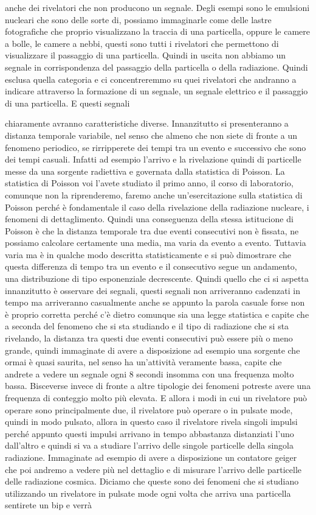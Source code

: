 anche dei rivelatori che non producono un segnale. Degli esempi sono le emulsioni nucleari che sono delle sorte di, possiamo immaginarle come delle lastre fotografiche che proprio visualizzano la traccia di una particella, oppure le camere a bolle, le camere a nebbi, questi sono tutti i rivelatori che permettono di visualizzare il passaggio di una particella. Quindi in uscita non abbiamo un segnale in corrispondenza del passaggio della particella o della radiazione. Quindi esclusa quella categoria e ci concentreremmo su quei rivelatori che andranno a indicare attraverso la formazione di un segnale, un segnale elettrico e il passaggio di una particella. E questi segnali 

chiaramente avranno caratteristiche diverse. Innanzitutto si presenteranno a distanza temporale variabile, nel senso che almeno che non siete di fronte a un fenomeno periodico, se rirripperete dei tempi tra un evento e successivo che sono dei tempi casuali. Infatti ad esempio l'arrivo e la rivelazione quindi di particelle messe da una sorgente radiettiva e governata dalla statistica di Poisson. La statistica di Poisson voi l'avete studiato il primo anno, il corso di laboratorio, comunque non la riprenderemo, faremo anche un'esercitazione sulla statistica di Poisson perché è fondamentale il caso della rivelazione della radiazione nucleare, i fenomeni di dettaglimento. Quindi una conseguenza della stessa istitucione di Poisson è che la distanza temporale tra due eventi consecutivi non è fissata, ne possiamo calcolare certamente una media, ma varia da evento a evento. Tuttavia varia ma è in qualche modo descritta statisticamente e si può dimostrare che questa differenza di tempo tra un evento e il consecutivo segue un andamento, una distribuzione di tipo esponenziale decrescente. Quindi quello che ci si aspetta innanzitutto è osservare dei segnali, questi segnali non arriveranno cadenzati in tempo ma arriveranno casualmente anche se appunto la parola casuale forse non è proprio corretta perché c'è dietro comunque sia una legge statistica e capite che a seconda del fenomeno che si sta studiando e il tipo di radiazione che si sta rivelando, la distanza tra questi due eventi consecutivi può essere più o meno grande, quindi immaginate di avere a disposizione ad esempio una sorgente che ormai è quasi saurita, nel senso ha un'attività veramente bassa, capite che andrete a vedere un segnale ogni 8 secondi insomma con una frequenza molto bassa. Bisceverse invece di fronte a altre tipologie dei fenomeni potreste avere una frequenza di conteggio molto più elevata. E allora i modi in cui un rivelatore può operare sono principalmente due, il rivelatore può operare o in pulsate mode, quindi in modo pulsato, allora in questo caso il rivelatore rivela singoli impulsi perché appunto questi impulsi arrivano in tempo abbastanza distanziati l'uno dall'altro e quindi si va a studiare l'arrivo delle singole particelle della singola radiazione. Immaginate ad esempio di avere a disposizione un contatore geiger che poi andremo a vedere più nel dettaglio e di misurare l'arrivo delle particelle delle radiazione cosmica. Diciamo che queste sono dei fenomeni che si studiano utilizzando un rivelatore in pulsate mode ogni volta che arriva una particella sentirete un bip e verrà 